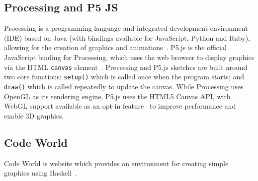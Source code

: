 \documentclass[../main.tex]{subfiles}
\begin{document}
        \subsection{Processing and P5 JS}
            Processing is a programming language and integrated development environment
                (IDE) based on Java (with bindings available for JavaScript, Python and Ruby),
                allowing for the creation of graphics and animations~\citep{X}.
            P5.js is the official JavaScript binding for Processing, which uses the web
                browser to display graphics via the HTML \texttt{canvas} element~\citep{X}.
            Processing and P5.js sketches are built around two core functions:
                \texttt{setup()} which is called once when the program starts; and
                \texttt{draw()} which is called repeatedly to update the canvas.
            While Processing uses OpenGL as its rendering engine, P5.js uses the HTML5
                Canvas API, with WebGL support available as an opt-in feature~\citep{X} to
                improve performance and enable 3D graphics.

        \subsection{Code World}
            Code World is website which provides an environment for creating simple
                graphics using Haskell~\citep{codeWorld}.
\end{document}

